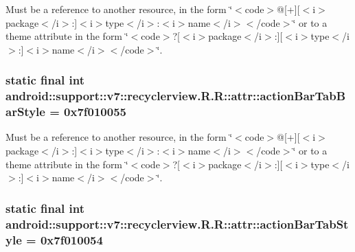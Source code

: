 Must be a reference to another resource, in the form \char`\"{}$<$code$>$@\mbox{[}+\mbox{]}\mbox{[}$<$i$>$package$<$/i$>$:\mbox{]}$<$i$>$type$<$/i$>$:$<$i$>$name$<$/i$>$$<$/code$>$\char`\"{} or to a theme attribute in the form \char`\"{}$<$code$>$?\mbox{[}$<$i$>$package$<$/i$>$:\mbox{]}\mbox{[}$<$i$>$type$<$/i$>$:\mbox{]}$<$i$>$name$<$/i$>$$<$/code$>$\char`\"{}. \hypertarget{classandroid_1_1support_1_1v7_1_1recyclerview_1_1_r_1_1attr_f3efc189fc78e993767812aaad2108a2}{
\subsubsection[{actionBarTabBarStyle}]{\setlength{\rightskip}{0pt plus 5cm}static final int android::support::v7::recyclerview.R.R::attr::actionBarTabBarStyle = 0x7f010055}}
\label{classandroid_1_1support_1_1v7_1_1recyclerview_1_1_r_1_1attr_f3efc189fc78e993767812aaad2108a2}


Must be a reference to another resource, in the form \char`\"{}$<$code$>$@\mbox{[}+\mbox{]}\mbox{[}$<$i$>$package$<$/i$>$:\mbox{]}$<$i$>$type$<$/i$>$:$<$i$>$name$<$/i$>$$<$/code$>$\char`\"{} or to a theme attribute in the form \char`\"{}$<$code$>$?\mbox{[}$<$i$>$package$<$/i$>$:\mbox{]}\mbox{[}$<$i$>$type$<$/i$>$:\mbox{]}$<$i$>$name$<$/i$>$$<$/code$>$\char`\"{}. \hypertarget{classandroid_1_1support_1_1v7_1_1recyclerview_1_1_r_1_1attr_62fdaa84b2319076d374cc0136e84e1c}{
\subsubsection[{actionBarTabStyle}]{\setlength{\rightskip}{0pt plus 5cm}static final int android::support::v7::recyclerview.R.R::attr::actionBarTabStyle = 0x7f010054}}
\label{classandroid_1_1support_1_1v7_1_1recyclerview_1_1_r_1_1attr_62fdaa84b2319076d374cc0136e84e1c}


